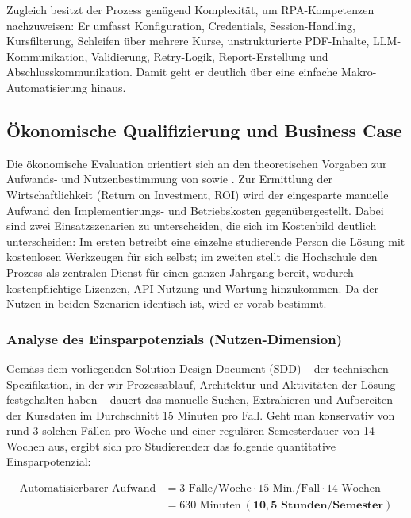 \documentclass[11pt]{scrartcl}
\begin{document}
Zugleich besitzt der Prozess genügend Komplexität, um RPA-Kompetenzen nachzuweisen: Er umfasst Konfiguration, Credentials, Session-Handling, Kursfilterung, Schleifen über mehrere Kurse, unstrukturierte PDF-Inhalte, LLM-Kommunikation, Validierung, Retry-Logik, Report-Erstellung und Abschlusskommunikation. Damit geht er deutlich über eine einfache Makro-Automatisierung hinaus.

\subsection{Ökonomische Qualifizierung und Business Case}
Die ökonomische Evaluation orientiert sich an den theoretischen Vorgaben zur Aufwands- und Nutzenbestimmung von \cite{Wanner2019} sowie \cite{Beetz2019}. Zur Ermittlung der Wirtschaftlichkeit (Return on Investment, ROI) wird der eingesparte manuelle Aufwand den Implementierungs- und Betriebskosten gegenübergestellt. Dabei sind zwei Einsatzszenarien zu unterscheiden, die sich im Kostenbild deutlich unterscheiden: Im ersten betreibt eine einzelne studierende Person die Lösung mit kostenlosen Werkzeugen für sich selbst; im zweiten stellt die Hochschule den Prozess als zentralen Dienst für einen ganzen Jahrgang bereit, wodurch kostenpflichtige Lizenzen, API-Nutzung und Wartung hinzukommen. Da der Nutzen in beiden Szenarien identisch ist, wird er vorab bestimmt.

\subsubsection{Analyse des Einsparpotenzials (Nutzen-Dimension)}
Gemäss dem vorliegenden Solution Design Document (SDD) -- der technischen Spezifikation, in der wir Prozessablauf, Architektur und Aktivitäten der Lösung festgehalten haben -- dauert das manuelle Suchen, Extrahieren und Aufbereiten der Kursdaten im Durchschnitt 15 Minuten pro Fall. Geht man konservativ von rund 3 solchen Fällen pro Woche und einer regulären Semesterdauer von 14 Wochen aus, ergibt sich pro Studierende:r das folgende quantitative Einsparpotenzial:

\begin{equation}
\begin{split}
\text{Automatisierbarer Aufwand} &= 3 \text{ Fälle/Woche} \cdot 15 \text{ Min./Fall} \cdot 14 \text{ Wochen} \\
&= 630 \text{ Minuten} \ (\mathbf{10{,}5 \text{ Stunden/Semester}})
\end{split}
\end{equation}
\end{document}
